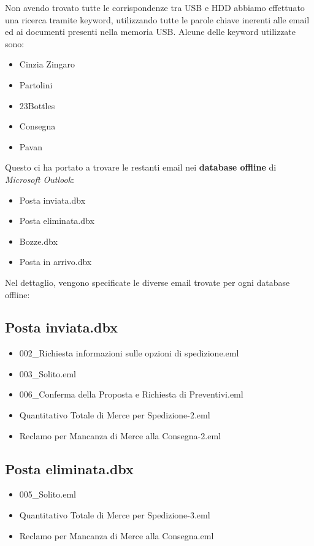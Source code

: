 Non avendo trovato tutte le corrispondenze tra USB e HDD abbiamo effettuato una ricerca tramite keyword, utilizzando tutte le parole chiave inerenti alle email ed ai documenti presenti nella memoria USB. Alcune delle keyword utilizzate sono:
\begin{itemize}
    \item Cinzia Zingaro
    \item Partolini
    \item 23Bottles
    \item Consegna
    \item Pavan
\end{itemize}
Questo ci ha portato a trovare le restanti email nei \textbf{database offline} di \textit{Microsoft Outlook}:
\begin{itemize}
    \item Posta inviata.dbx
    \item Posta eliminata.dbx
    \item Bozze.dbx
    \item Posta in arrivo.dbx
\end{itemize}

\pagebreak

Nel dettaglio, vengono specificate le diverse email trovate per ogni database offline:
\subsection{Posta inviata.dbx}
\begin{itemize}
    \item 002\_Richiesta informazioni sulle opzioni di spedizione.eml
    \item 003\_Solito.eml
    \item 006\_Conferma della Proposta e Richiesta di Preventivi.eml
    \item Quantitativo Totale di Merce per Spedizione-2.eml
    \item Reclamo per Mancanza di Merce alla Consegna-2.eml
\end{itemize}

\subsection{Posta eliminata.dbx}
\begin{itemize}
    \item 005\_Solito.eml
    \item Quantitativo Totale di Merce per Spedizione-3.eml
    \item Reclamo per Mancanza di Merce alla Consegna.eml
\end{itemize}

